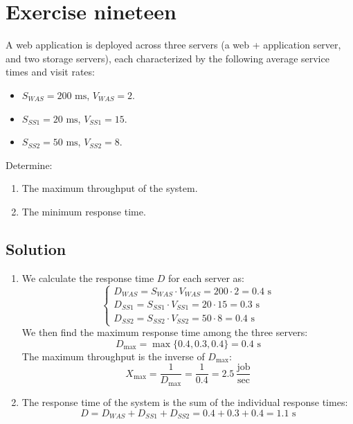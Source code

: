 \section{Exercise nineteen}

A web application is deployed across three servers (a web + application server, and two storage servers), each characterized by the following average service times and visit rates:
\begin{itemize}
    \item $S_{WAS} = 200\text{ ms}$, $V_{WAS} = 2$.
    \item $S_{SS1} = 20\text{ ms}$, $V_{SS1} = 15$.
    \item $S_{SS2} = 50\text{ ms}$, $V_{SS2} = 8$.
\end{itemize}
Determine:
\begin{enumerate}
    \item The maximum throughput of the system.
    \item The minimum response time.
\end{enumerate}

\subsection*{Solution}
\begin{enumerate}
    \item We calculate the response time $D$ for each server as:
        \[\begin{cases}
            D_{WAS}=S_{WAS}\cdot V_{WAS}= 200 \cdot 2 = 0.4\text{ s} \\
            D_{SS1}=S_{SS1}\cdot V_{SS1}= 20 \cdot 15 = 0.3\text{ s} \\
            D_{SS2}=S_{SS2}\cdot V_{SS2}= 50 \cdot 8 = 0.4\text{ s}
        \end{cases}\]
        We then find the maximum response time among the three servers:
        \[D_{\max}=\max\{0.4,0.3,0.4\}=0.4\text{ s}\]
        The maximum throughput is the inverse of $D_{\max}$:
        \[X_{\max}=\dfrac{1}{D_{\max}}=\dfrac{1}{0.4}=2.5\:\dfrac{\text{job}}{\text{sec}}\]
    \item The response time of the system is the sum of the individual response times:
        \[D=D_{WAS}+D_{SS1}+D_{SS2}=0.4+0.3+0.4=1.1\text{ s}\]
\end{enumerate}